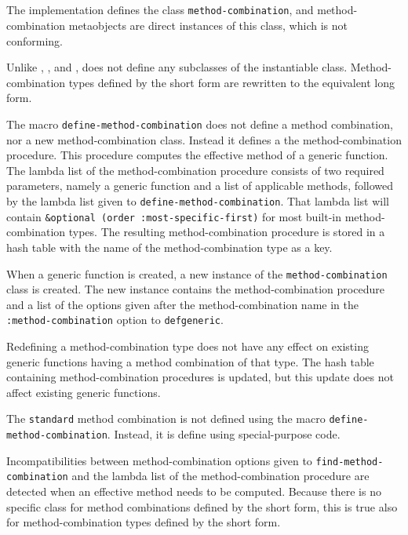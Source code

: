 \subsection{\ecl{}}
\label{sec-ecl}

The \ecl{} \commonlisp{} implementation defines the class
\texttt{method-combination}, and method-combination metaobjects are
direct instances of this class, which is not conforming.

Unlike \pcl{}, \sbcl{}, and \ccl{}, \ecl{} does not define any
subclasses of the instantiable class.  Method-combination types
defined by the short form are rewritten to the equivalent long form.

The macro \texttt{define-method-combination} does not define a method
combination, nor a new method-combination class.  Instead it defines a
the method-combination procedure.  This procedure computes the
effective method of a generic function.  The lambda list of the
method-combination procedure consists of two required parameters,
namely a generic function and a list of applicable methods, followed
by the lambda list given to \texttt{define-method-combination}.  That
lambda list will contain \texttt{\&optional (order
  :most-specific-first)} for most built-in method-combination types.
The resulting method-combination procedure is stored in a hash table
with the name of the method-combination type as a key.

When a generic function is created, a new instance of the
\texttt{method-combination} class is created.  The new instance
contains the method-combination procedure and a list of the options
given after the method-combination name in the
\texttt{:method-combination} option to \texttt{defgeneric}.

Redefining a method-combination type does not have any effect on
existing generic functions having a method combination of that type.
The hash table containing method-combination procedures is updated,
but this update does not affect existing generic functions.

The \texttt{standard} method combination is not defined using the
macro \texttt{define-method-combination}.  Instead, it is define using
special-purpose code.

Incompatibilities between method-combination options given to
\texttt{find-method-combination} and the lambda list of the
method-combination procedure are detected when an effective method
needs to be computed.  Because there is no specific class for method
combinations defined by the short form, this is true also for
method-combination types defined by the short form.

